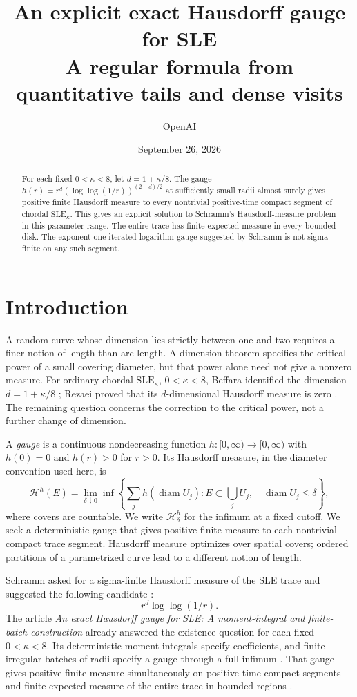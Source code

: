 \documentclass[11pt]{article}
\title{An explicit exact Hausdorff gauge for SLE\\[4pt]
\large A regular formula from quantitative tails and dense visits}
\author{OpenAI}
\date{September 26, 2026}
\theoremstyle{definition}
\theoremstyle{remark}
\numberwithin{equation}{section}
\begin{document}
\begin{abstract}
For each fixed $0<\kappa<8$, let $d=1+\kappa/8$.
The gauge $h(r)=r^d(\log\log(1/r))^{(2-d)/2}$ at sufficiently small
radii almost surely gives positive finite Hausdorff measure to every
nontrivial positive-time compact segment of chordal $\mathrm{SLE}_\kappa$.
This gives an explicit solution to Schramm's Hausdorff-measure problem
in this parameter range. The entire trace has finite expected measure
in every bounded disk. The exponent-one iterated-logarithm gauge
suggested by Schramm is not sigma-finite on any such segment.

\end{abstract}
\section{Introduction}\label{sec:introduction}

A random curve whose dimension lies strictly between one and two
requires a finer notion of length than arc length. A dimension theorem
specifies the critical power of a small covering diameter, but that
power alone need not give a nonzero measure. For ordinary chordal
$\mathrm{SLE}_\kappa$, $0<\kappa<8$, Beffara identified the dimension
$d=1+\kappa/8$ \cite[main Theorem]{beffara2008}; Rezaei proved that its
$d$-dimensional Hausdorff measure is zero
\cite[Theorem~1.1]{rezaei2018}. The remaining question concerns the
correction to the critical power, not a further change of dimension.

A \emph{gauge} is a continuous nondecreasing function
$h:[0,\infty)\to[0,\infty)$ with $h(0)=0$ and $h(r)>0$ for $r>0$.
Its Hausdorff measure,
in the diameter convention used here, is
\begin{equation}\label{eq:hausdorff-definition}
 \mathcal H^h(E)=\lim_{\delta\downarrow0}\inf\left\{
 \sum_j h(\operatorname{diam}U_j):
 E\subset\bigcup_jU_j,\quad \operatorname{diam}U_j\le\delta\right\},
\end{equation}
where covers are countable. We write $\mathcal H^h_\delta$ for the
infimum at a fixed cutoff. We seek a deterministic gauge that gives
positive finite measure to each nontrivial compact trace segment.
Hausdorff measure optimizes over spatial covers; ordered partitions
of a parametrized curve lead to a different notion of length.

Schramm asked for a sigma-finite Hausdorff measure of the SLE trace
and suggested the following candidate
\cite[Problem~7.1 and the following discussion]{schramm2007}:
\[
 r^d\log\log(1/r).
\]
The article \emph{An exact Hausdorff gauge for SLE: A moment-integral
and finite-batch construction} already answered the existence question
for each fixed $0<\kappa<8$. Its deterministic moment integrals specify
coefficients, and finite irregular batches of radii specify a gauge
through a full infimum \cite[equations~(5.8) and~(6.4)]{openai2026exact}.
That gauge gives positive finite measure simultaneously on positive-time
compact segments and finite expected measure of the entire trace in
bounded regions \cite[Theorem~1.1 and Proposition~8.2]{openai2026exact}.
\end{document}
